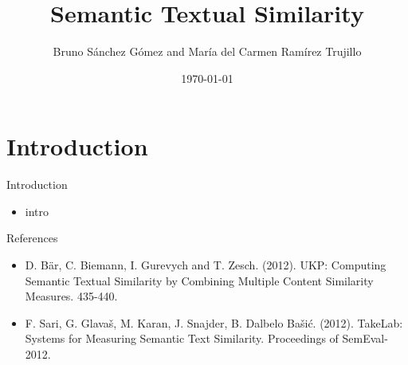 \documentclass{beamer}
\title{Semantic Textual Similarity}
\author{Bruno Sánchez Gómez and María del Carmen Ramírez Trujillo}
\date{\today}
\begin{document}
\begin{frame}
    \titlepage
\end{frame}

\section{Introduction}
\begin{frame}{Introduction}
    \begin{itemize}
        \item intro
    \end{itemize}
\end{frame}



\begin{frame}{References}
    \begin{itemize}
        \item D. Bär, C. Biemann, I. Gurevych and T. Zesch. (2012). UKP: Computing Semantic Textual Similarity by Combining Multiple Content Similarity Measures. 435-440. 
        \item F. Sari, G. Glavaš, M. Karan, J. Snajder, B. Dalbelo Bašić. (2012). TakeLab: Systems for Measuring Semantic Text Similarity. Proceedings of SemEval-2012. 
    \end{itemize}    
\end{frame}
\end{document}
